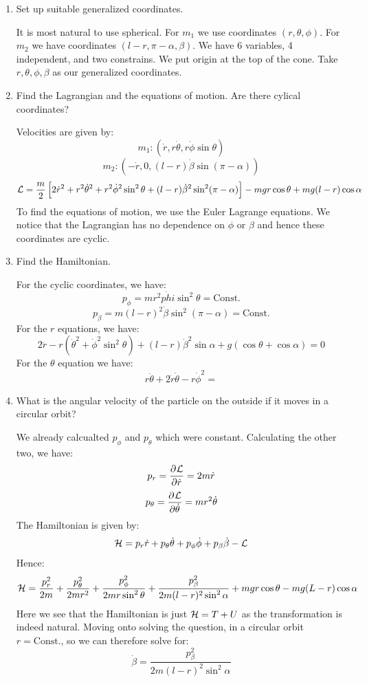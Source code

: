 \documentclass[../PHYS306Notes.tex]{subfiles}
\begin{document}
\begin{enumerate}
    \item Set up suitable generalized coordinates.
    \begin{s}
    It is most natural to use spherical. For $m_1$ we use coordinates $(r, \theta, \phi)$. For $m_2$ we have coordinates $(l - r, \pi - \alpha, \beta)$. We have 6 variables, 4 independent, and two constrains. We put origin at the top of the cone. Take $r, \theta, \phi, \beta$ as our generalized coordinates.
    \end{s}
    \item Find the Lagrangian and the equations of motion. Are there cylical coordinates?
    \begin{s}
    Velocities are given by:
    \[m_1: (\dot{r}, r\dot{\theta}, r\dot{\phi}\sin\theta)\]
    \[m_2: (-\dot{r}, 0, (l-r)\dot{\beta}\sin(\pi - \alpha))\]
    \[\mathcal{L} = \frac{m}{2}\left[2\dot{r}^2 + r^2\dot{\theta}^2 + r^2\dot{\phi}^2\sin^2\theta + (l-r)\dot{\beta}^2\sin^2(\pi - \alpha)\right] - mgr\cos\theta + mg(l-r)\cos\alpha\]
    To find the equations of motion, we use the Euler Lagrange equations. We notice that the Lagrangian has no dependence on $\phi$ or $\beta$ and hence these coordinates are cyclic.
    \end{s}
    \item Find the Hamiltonian.
    \begin{s}
    For the cyclic coordinates, we have:
    \[p_\phi = mr^2\dot{phi}\sin^2\theta = \text{Const.}\]
    \[p_\beta = m(l-r)^2\dot{\beta}\sin^2(\pi - \alpha) = \text{Const.}\]
    For the $r$ equations, we have:
    \[2\ddot{r} - r(\dot{\theta}^2 + \dot{\phi}^2\sin^2\theta) + (l-r)\dot{\beta}^2\sin\alpha + g(\cos\theta + \cos\alpha) = 0\]
    For the $\theta$ equation we have:
    \[r\ddot{\theta} + 2\dot{r}\dot{\theta} - r\dot{\phi}^2 = \]
    \end{s}
    \item What is the angular velocity of the particle on the outside if it moves in a circular orbit?
    \begin{s}
    We already calcualted $p_\phi$ and $p_\theta$ which were constant. Calculating the other two, we have:
    \[p_r = \dpd{\LL}{\dot{r}} = 2m\dot{r}\]
    \[p_\theta = \dpd{\LL}{\dot{\theta}} = mr^2\dot{\theta}\]
    The Hamiltonian is given by:
    \[\mathcal{H} = p_r\dot{r} + p_\theta\dot{\theta} + p_\phi\dot{\phi} + p_\beta\dot{\beta} - \mathcal{L}\]
    Hence:
    \[\mathcal{H} = \frac{p_r^2}{2m} + \frac{p_\theta^2}{2mr^2} + \frac{p_\phi^2}{2mr\sin^2\theta} + \frac{p_\beta^2}{2m(l-r)^2\sin^2\alpha} + mgr\cos\theta - mg(L-r)\cos\alpha\]
    Here we see that the Hamiltonian is just $\mathcal{H} = T + U$ as the transformation is indeed natural. Moving onto solving the question, in a circular orbit $r = \text{Const.}$, so we can therefore solve for:
    \[\dot{\beta} = \frac{p_\beta^2}{2m(l-r)^2\sin^2\alpha}\]
    \end{s}
\end{enumerate}
\end{document}
